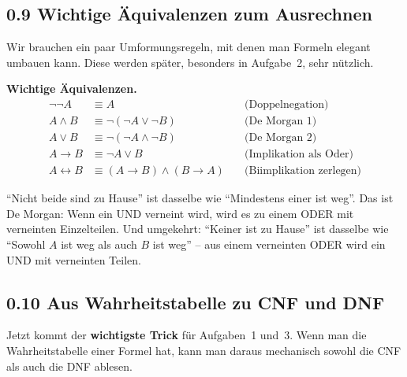 \documentclass[a4paper,12pt]{article}
\begin{document}
\subsection*{0.9 Wichtige \"Aquivalenzen zum Ausrechnen}

Wir brauchen ein paar Umformungsregeln, mit denen man Formeln
elegant umbauen kann. Diese werden sp\"ater, besonders in Aufgabe~2,
sehr n\"utzlich.

\begin{merkbox}
\textbf{Wichtige \"Aquivalenzen.}
\begin{align*}
\neg\neg A &\equiv A \quad &\text{(Doppelnegation)}\\
A \wedge B &\equiv \neg(\neg A \vee \neg B) \quad &\text{(De Morgan 1)}\\
A \vee B &\equiv \neg(\neg A \wedge \neg B) \quad &\text{(De Morgan 2)}\\
A \to B &\equiv \neg A \vee B \quad &\text{(Implikation als Oder)}\\
A \leftrightarrow B &\equiv (A \to B) \wedge (B \to A) \quad &\text{(Biimplikation zerlegen)}
\end{align*}
\end{merkbox}

\begin{analogie}[title={Analogie zu De Morgan}]
"`Nicht beide sind zu Hause"' ist dasselbe wie "`Mindestens einer ist
weg"'. Das ist De Morgan: Wenn ein UND verneint wird, wird es zu einem
ODER mit verneinten Einzelteilen. Und umgekehrt: "`Keiner ist zu
Hause"' ist dasselbe wie "`Sowohl $A$ ist weg als auch $B$ ist weg"'
-- aus einem verneinten ODER wird ein UND mit verneinten Teilen.
\end{analogie}

\subsection*{0.10 Aus Wahrheitstabelle zu CNF und DNF}

Jetzt kommt der \textbf{wichtigste Trick} f\"ur Aufgaben~1 und~3.
Wenn man die Wahrheitstabelle einer Formel hat, kann man daraus
mechanisch sowohl die CNF als auch die DNF ablesen.
\end{document}
